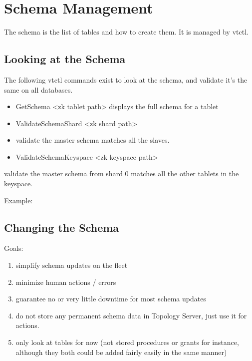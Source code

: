 \section{Schema Management}\label{Schema-Management}

The schema is the list of tables and how to create them. It is managed by vtctl.

\subsection{Looking at the Schema}\hypertarget{looking-at-the-schema}{}\label{looking-at-the-schema}

The following vtctl commands exist to look at the schema, and validate it's the same on all databases.



\begin{itemize}
\item GetSchema \textless{}zk tablet path\textgreater{} displays the full schema for a tablet
\item ValidateSchemaShard \textless{}zk shard path\textgreater{}
\item validate the master schema matches all the slaves.
\item ValidateSchemaKeyspace \textless{}zk keyspace path\textgreater{}
\end{itemize}
validate the master schema from shard 0 matches all the other tablets in the keyspace.

Example:



\subsection{Changing the Schema}\hypertarget{changing-the-schema}{}\label{changing-the-schema}

Goals:
\begin{enumerate}
\item simplify schema updates on the fleet
\item minimize human actions / errors
\item guarantee no or very little downtime for most schema updates
\item do not store any permanent schema data in Topology Server, just use it for actions.
\item only look at tables for now (not stored procedures or grants for instance, although they both could be added fairly easily in the same manner)
\end{enumerate}

